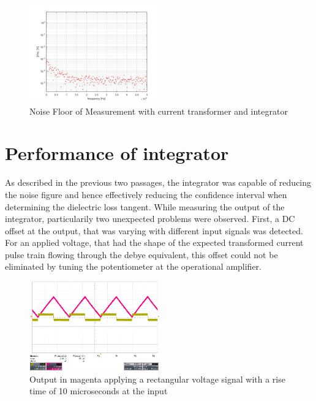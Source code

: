 \begin{figure}[htbp]
 \centering
 \centerline{\includegraphics[width=0.5\textwidth]{figures/Results/NoiseFloor/Integrator.jpg}}

\caption[Kurze Abbildungsbeschreibung]{Noise Floor of Measurement with current transformer and integrator }
\label{fig.noisefloorintegrator}
\end{figure}




\section{Performance of integrator}
\label{sec.perfint}
As described in the previous two passages, the integrator was capable of reducing the noise figure and hence effectively reducing 
the confidence interval when determining the dielectric loss tangent. While measuring the output of the integrator, particularily two unexpected problems were observed.
First, a DC offset at the output, that was varying with different input signals was detected. For an applied voltage, that had the shape of the expected transformed current pulse train
flowing through the debye equivalent, this offset could not be eliminated by tuning the potentiometer at the operational amplifier.

\begin{figure}[htbp]
 \centering
 \centerline{\includegraphics[width=0.5\textwidth]{figures/Results/Integrator_measurements/voltwave_10us}}

  \caption[Kurze Abbildungsbeschreibung]{Output in magenta applying a rectangular voltage signal with a rise time of 10 microseconds at the input}
\label{fig.voltwave_10us}
\end{figure}

